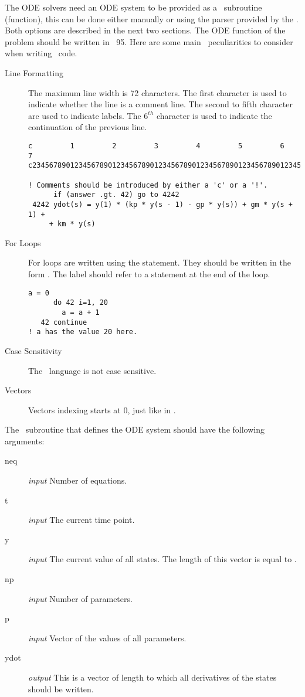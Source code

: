 The ODE solvers need an ODE system to be provided as a \Fortran~subroutine (function), this can be done either manually or using the parser provided by the \PPODESUITE. Both options are described in the next two sections.
The ODE function of the problem should be written in \Fortran~95. Here are some main \Fortran~peculiarities to consider when writing \Fortran~code.
\begin{description}
 \item[Line Formatting] The maximum line width is 72 characters. The first character is used to indicate whether the line is a comment line. The second to fifth character are used to indicate labels. The $6^{th}$ character is used to indicate the continuation of the previous line.
 \begin{lstlisting}[style=fortrancode,caption=Syntax Example]
c         1         2         3         4         5         6         7
c23456789012345678901234567890123456789012345678901234567890123456789012

! Comments should be introduced by either a 'c' or a '!'.
      if (answer .gt. 42) go to 4242
 4242 ydot(s) = y(1) * (kp * y(s - 1) - gp * y(s)) + gm * y(s + 1) +
     + km * y(s)
 \end{lstlisting}
 \item[For Loops] For loops are written using the  statement. They should be written in the form . The label should refer to a  statement at the end of the loop.
  \begin{lstlisting}[style=fortrancode,caption=Do-Loop]
      a = 0
      do 42 i=1, 20
        a = a + 1
   42 continue
! a has the value 20 here.
 \end{lstlisting}
 \item[Case Sensitivity] The \Fortran~language is not case sensitive.
 \item[Vectors] Vectors indexing starts at 0, just like in \MATLAB.
\end{description}

The \Fortran~subroutine that defines the ODE system should have the following arguments:
\begin{description}
 \item[neq] \emph{input} Number of equations.
 \item[t] \emph{input} The current time point.
 \item[y] \emph{input} The current value of all states. The length of this vector is equal to .
 \item[np] \emph{input} Number of parameters.
 \item[p] \emph{input} Vector of the values of all parameters.
 \item[ydot] \emph{output} This is a vector of length  to which all derivatives of the states should be written.
\end{description}

